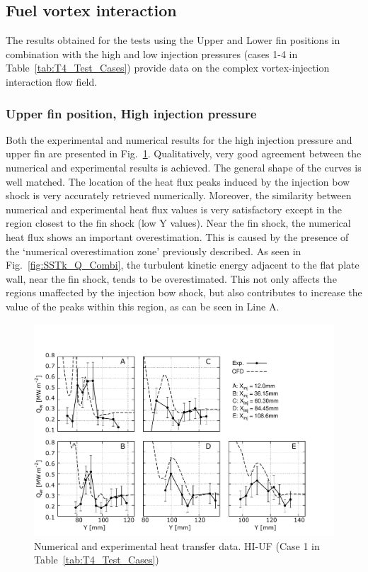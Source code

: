 \documentclass{AIAA}
\begin{document}
\subsection{Fuel vortex interaction}

The results obtained for the tests using the Upper and Lower fin positions in combination with the high and low injection pressures (cases 1-4 in Table~\ref{tab:T4_Test_Cases}) provide data on the complex vortex-injection interaction flow field.


\subsubsection{Upper fin position, High injection pressure}

Both the experimental and numerical results for the high injection pressure and upper fin are presented in Fig.~\ref{fig:HeatFluxLPHIUF}.
Qualitatively, very good agreement between the numerical and experimental results is achieved.
The general shape of the curves is well matched.
The location of the heat flux peaks induced by the injection bow shock is very accurately retrieved numerically.
Moreover, the similarity between numerical and experimental heat flux values is very satisfactory except in the region closest to the fin shock (low Y values).
Near the fin shock, the numerical heat flux shows an important overestimation.
This is caused by the presence of the `numerical overestimation zone' previously described. 
As seen in Fig.~\ref{fig:SSTk_Q_Combi}, the turbulent kinetic energy adjacent to the flat plate wall, near the fin shock, tends to be overestimated.
This not only affects the regions unaffected by the injection bow shock, but also contributes to increase the value of the peaks within this region, as can be seen in Line A. 


%
\begin{figure}[!h]
\center
\includegraphics[trim = 0mm 3mm 25mm 25mm, clip, width=0.60\columnwidth,valign=t,fbox]{Figures/Data/LP_HI_UF/GNUP_CFD_GaugesLines_Multi.pdf}
\caption{Numerical and experimental heat transfer data. HI-UF (Case 1 in Table~\ref{tab:T4_Test_Cases})}
\label{fig:HeatFluxLPHIUF}
\end{figure} 
\end{document}
